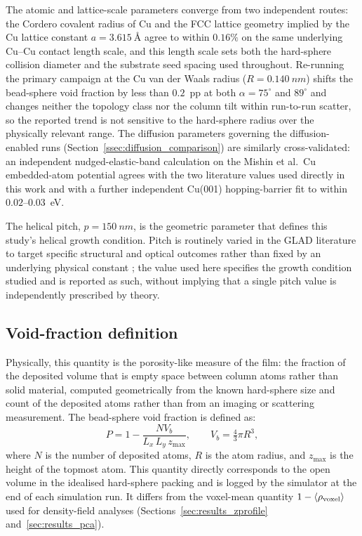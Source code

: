 \documentclass[aip,amsmath,amssymb,reprint]{revtex4-1}
\newcommand{\dang}{\ensuremath{\alpha}}
\newcommand{\bsP}{\ensuremath{P}}
\begin{document}
The atomic and lattice-scale parameters converge from two independent
routes: the Cordero covalent radius of Cu \citep{cordero2008} and the FCC
lattice geometry implied by the Cu lattice constant
$a=\SI{3.615}{\angstrom}$ \citep{straumanis1969} agree to within $0.16\%$
on the same underlying Cu--Cu contact length scale, and this length scale
sets both the hard-sphere collision diameter and the substrate seed
spacing used throughout.
Re-running the primary campaign at the Cu van der Waals radius
($R = \SI{0.140}{nm}$) shifts the bead-sphere void fraction by less than
$0.2$~pp at both $\dang = 75^{\circ}$ and $89^{\circ}$ and changes neither
the topology class nor the column tilt within run-to-run scatter, so the
reported trend is not sensitive to the hard-sphere radius over the
physically relevant range. The diffusion parameters governing the
diffusion-enabled runs (Section~\ref{ssec:diffusion_comparison}) are
similarly cross-validated: an independent nudged-elastic-band calculation
on the Mishin et al.\ Cu embedded-atom potential \citep{mishin2001cu}
agrees with the two literature values used directly in this work
\citep{boisvert1997cu,jamnig2019} and with a further independent Cu(001)
hopping-barrier fit \citep{mehl1999} to within $0.02$--$0.03$~eV.

The helical pitch, $p=\SI{150}{nm}$, is the geometric parameter that
defines this study's helical growth condition. Pitch is routinely varied
in the GLAD literature to target specific structural and optical outcomes
rather than fixed by an underlying physical constant
\citep{park2009pitch}; the value used here specifies the growth
condition studied and is reported as such, without implying that a single
pitch value is independently prescribed by theory.

\subsection{Void-fraction definition}
\label{ssec:vf}

Physically, this quantity is the porosity-like measure of the film: the
fraction of the deposited volume that is empty space between column atoms
rather than solid material, computed geometrically from the known
hard-sphere size and count of the deposited atoms rather than from an
imaging or scattering measurement.
The bead-sphere void fraction is defined as:
\begin{equation}
  \bsP = 1 - \frac{N V_b}{L_x \, L_y \, z_{\max}},
  \qquad
  V_b = \tfrac{4}{3}\pi R^3,
  \label{eq:bead_sphere}
\end{equation}
where $N$ is the number of deposited atoms, $R$ is the atom radius,
and $z_{\max}$ is the height of the topmost atom.  This quantity
directly corresponds to the open volume in the idealised hard-sphere
packing and is logged by the simulator at the end of each simulation run.
It differs from the voxel-mean quantity $1 - \langle\rho_{\rm voxel}\rangle$
used for density-field analyses (Sections~\ref{sec:results_zprofile}
and~\ref{sec:results_pca}).
\end{document}
